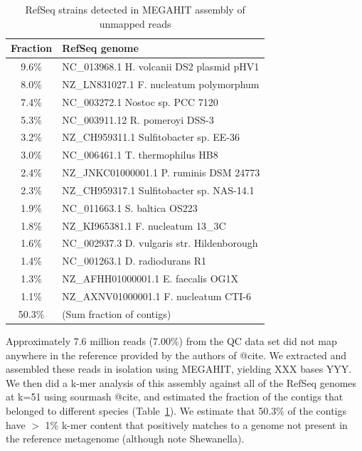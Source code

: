 \documentclass[10pt,a4paper,twocolumn]{article}
\begin{document}
\begin{table}[t]
\caption{RefSeq strains detected in MEGAHIT assembly of unmapped reads}
\centering
\begin{tabular}{|c|l|}
\hline

\textbf{Fraction}& \textbf{RefSeq genome} \\ [0.5ex] %
\hline

9.6\% & {\small NC\_013968.1 H. volcanii DS2 plasmid pHV1} \\
\hline
8.0\% & {\small NZ\_LN831027.1 F. nucleatum polymorphum} \\
\hline
7.4\% & {\small NC\_003272.1 Nostoc sp. PCC 7120} \\
\hline
5.3\% & {\small NC\_003911.12 R. pomeroyi DSS-3} \\
\hline
3.2\% & {\small NZ\_CH959311.1 Sulfitobacter sp. EE-36} \\
\hline
3.0\% & {\small NC\_006461.1 T. thermophilus HB8} \\
\hline
2.4\% & {\small NZ\_JNKC01000001.1 P. ruminis DSM 24773} \\
\hline
2.3\% & {\small NZ\_CH959317.1 Sulfitobacter sp. NAS-14.1} \\
\hline
1.9\% & {\small NC\_011663.1 S. baltica OS223} \\
\hline
1.8\% & {\small NZ\_KI965381.1 F. nucleatum 13\_3C} \\
\hline
1.6\% & {\small NC\_002937.3 D. vulgaris str. Hildenborough} \\
\hline
1.4\% & {\small NC\_001263.1 D. radiodurans R1} \\
\hline
1.3\% & {\small NZ\_AFHH01000001.1 E. faecalis OG1X} \\
\hline
1.1\% & {\small NZ\_AXNV01000001.1 F. nucleatum CTI-6} \\
\hline

50.3\% & {\small (Sum fraction of contigs)} \\
\hline

\end{tabular}
\label{table:gather}
\end{table}

Approximately 7.6 million reads (7.00\%) from the QC data set did not
map anywhere in the reference provided by the authors of @cite.  We
extracted and assembled these reads in isolation using MEGAHIT,
yielding XXX bases YYY.  We then did a k-mer analysis of this assembly
against all of the RefSeq genomes at k=51 using sourmash @cite, and
estimated the fraction of the contigs that belonged to different
species (Table~\ref{table:gather}). We estimate that 50.3\% of the
contigs have $>$ 1\% k-mer content that positively matches to a genome
not present in the reference metagenome (although note Shewanella).
\end{document}
